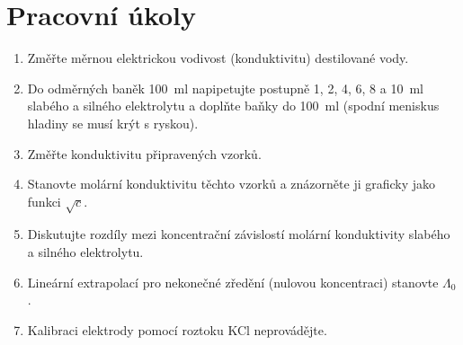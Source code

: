 \documentclass[a4paper]{article}
\author{Vladislav Wohlrath}
\begin{document}
\begin{titlepage}

\end{titlepage}

\section*{Pracovní úkoly}
\begin{enumerate}
\item Změřte měrnou elektrickou vodivost (konduktivitu) destilované vody.
\item Do odměrných baněk \SI{100}{\milli\litre} napipetujte postupně 1, 2, 4, 6, 8 a \SI{10}{\milli\litre} slabého a silného elektrolytu a doplňte baňky do \SI{100}{\milli\litre} (spodní meniskus hladiny se musí krýt s ryskou).
\item Změřte konduktivitu připravených vzorků.
\item Stanovte molární konduktivitu těchto vzorků a znázorněte ji graficky jako funkci $\sqrt{c}$.
\item Diskutujte rozdíly mezi koncentrační závislostí molární konduktivity slabého a silného elektrolytu.
\item Lineární extrapolací pro nekonečné zředění (nulovou koncentraci) stanovte $\Lambda_0$.
\item Kalibraci elektrody pomocí roztoku KCl neprovádějte.
\end{enumerate}










\printbibliography[title={Seznam použité literatury}]
\end{document}
